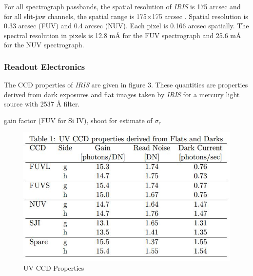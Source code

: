 \documentclass[10pt,a4paper,titlepage]{article}
\begin{document}
			For all spectrograph passbands, the spatial resolution of \textit{IRIS} is 175 arcsec and for all slit-jaw channels, the spatial range is 175$\times$175 arcsec \cite{ITN1}. Spatial resolution is 0.33 arcsec (FUV) and 0.4 arcsec (NUV). Each pixel is 0.166 arcsec spatially. The spectral resolution in pixels is 12.8 m{\AA} for the FUV spectrograph and 25.6 m{\AA} for the NUV spectrograph.
			
			\subsubsection{Readout Electronics}
			The CCD properties of \textit{IRIS} are given in figure 3. These quantities are properties derived from dark exposures and flat images taken by \textit{IRIS} for a mercury light source with 2537 {\AA} filter.
			
			gain factor (FUV for Si IV), shoot for estimate of $\sigma_r$
				\begin{figure}[H]
					\includegraphics[scale=0.6]{gaintable}
					\centering
					\caption{UV CCD Properties \cite{ITN25}}
					\centering
				\end{figure}
			
\end{document}
